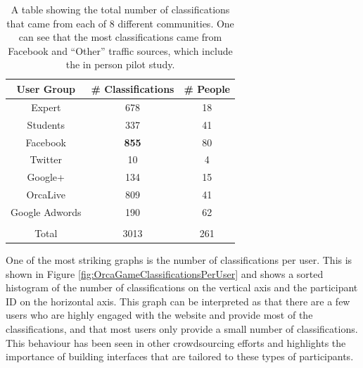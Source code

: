 \begin{table}
\begin{tabular}{|c|c|c|}
\hline
User Group      &   \# Classifications & \# People \\
\hline                                             
Expert          &   678                & 18        \\
Students        &   337                & 41        \\
Facebook        &   \textbf{855}       & 80        \\
Twitter         &   10                 & 4         \\
Google+         &   134                & 15        \\
OrcaLive        &   809                & 41        \\
Google Adwords  &   190                & 62        \\
\hline                                 &           \\
Total             &	3013               & 261       \\
\hline
\end{tabular}
\caption{A table showing the total number of classifications that came
  from each of 8 different communities.  One can see that the most
  classifications came from Facebook and ``Other'' traffic sources,
  which include the in person pilot study.}
\label{table:OrcaGameTotalNum}
\end{table}

One of the most striking graphs is the number of classifications per
user. This is shown in Figure
\ref{fig:OrcaGameClassificationsPerUser} and shows a sorted histogram
of the number of classifications on the vertical axis and the
participant ID on the horizontal axis.  This graph can be interpreted
as that there are a few users who are highly engaged with the website
and provide most of the classifications, and that most users only
provide a small number of classifications.  This behaviour has been
seen in other crowdsourcing efforts and highlights the importance of
building interfaces that are tailored to these types of participants.
	

